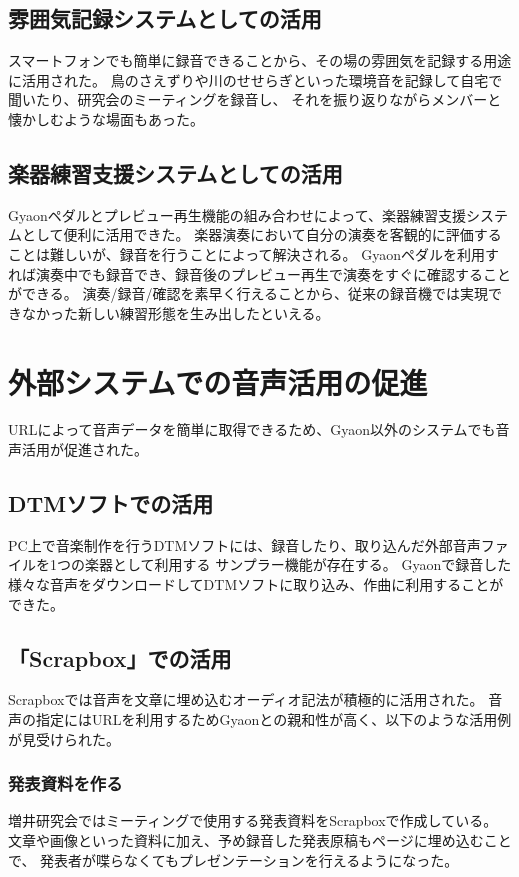 \subsection{雰囲気記録システムとしての活用}
スマートフォンでも簡単に録音できることから、その場の雰囲気を記録する用途に活用された。
鳥のさえずりや川のせせらぎといった環境音を記録して自宅で聞いたり、研究会のミーティングを録音し、
それを振り返りながらメンバーと懐かしむような場面もあった。

\subsection{楽器練習支援システムとしての活用}
Gyaonペダルとプレビュー再生機能の組み合わせによって、楽器練習支援システムとして便利に活用できた。
楽器演奏において自分の演奏を客観的に評価することは難しいが、録音を行うことによって解決される。
Gyaonペダルを利用すれば演奏中でも録音でき、録音後のプレビュー再生で演奏をすぐに確認することができる。
演奏/録音/確認を素早く行えることから、従来の録音機では実現できなかった新しい練習形態を生み出したといえる。




\section{外部システムでの音声活用の促進}
URLによって音声データを簡単に取得できるため、Gyaon以外のシステムでも音声活用が促進された。

\subsection{DTMソフトでの活用}
PC上で音楽制作を行うDTMソフトには、録音したり、取り込んだ外部音声ファイルを1つの楽器として利用する
サンプラー機能が存在する。
Gyaonで録音した様々な音声をダウンロードしてDTMソフトに取り込み、作曲に利用することができた。

\subsection{「Scrapbox」での活用}
Scrapboxでは音声を文章に埋め込むオーディオ記法が積極的に活用された。
音声の指定にはURLを利用するためGyaonとの親和性が高く、以下のような活用例が見受けられた。

\subsubsection{発表資料を作る}
増井研究会ではミーティングで使用する発表資料をScrapboxで作成している。
文章や画像といった資料に加え、予め録音した発表原稿もページに埋め込むことで、
発表者が喋らなくてもプレゼンテーションを行えるようになった。

